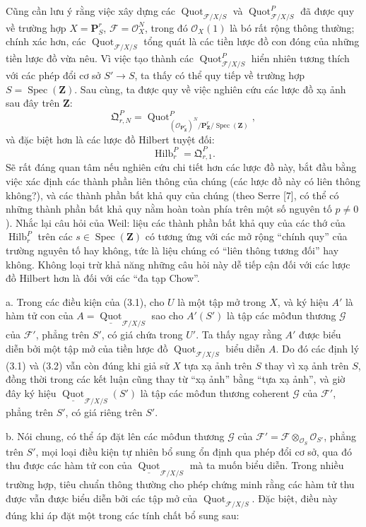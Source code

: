  Cũng cần lưu ý rằng việc xây dựng các
$\operatorname{Quot}_{\mathcal F/X/S}$ và
$\operatorname{Quot}^P_{\mathcal F/X/S}$ đã được quy về trường hợp
$X=\mathbf P^r_S$, $\mathcal F=\mathcal O_X^N$, trong đó
$\mathcal O_X(1)$ là bó rất rộng thông thường; chính xác hơn, các
$\operatorname{Quot}_{\mathcal F/X/S}$ tổng quát là các tiền lược đồ con đóng
của những tiền lược đồ vừa nêu. Vì việc tạo thành các
$\operatorname{Quot}^P_{\mathcal F/X/S}$ hiển nhiên tương thích với các phép
đổi cơ sở $S'\longrightarrow S$, ta thấy có thể quy tiếp về trường hợp
$S=\operatorname{Spec}(\mathbf Z)$. Sau cùng, ta được quy về việc nghiên
cứu các lược đồ xạ ảnh sau đây trên $\mathbf Z$:
\[
\mathfrak Q^P_{r,N}=
\operatorname{Quot}^{P}_{(\mathcal O_{\mathbf P^r_{\mathbf Z}})^N/
\mathbf P^r_{\mathbf Z}/\operatorname{Spec}(\mathbf Z)},
\]
và đặc biệt hơn là các lược đồ Hilbert tuyệt đối:
\[
\operatorname{Hilb}^P_r=\mathfrak Q^P_{r,1}.
\]
Sẽ rất đáng quan tâm nếu nghiên cứu chi tiết hơn các lược đồ này, bắt đầu bằng
việc xác định các thành phần liên thông của chúng (các lược đồ này có liên
thông không?), và các thành phần bất khả quy của
chúng (theo Serre [7], có thể có những thành phần bất khả quy nằm hoàn toàn
phía trên một số nguyên tố $p\neq0$). Nhắc lại câu hỏi của Weil: liệu các thành
phần bất khả quy của các thớ của $\operatorname{Hilb}^P_r$ trên các
$s\in\operatorname{Spec}(\mathbf Z)$ có tương ứng với các mở rộng
``chính quy'' của trường nguyên tố hay không, tức là liệu chúng có ``liên thông
tương đối'' hay không. Không loại trừ khả năng những câu hỏi này dễ tiếp cận
đối với các lược đồ Hilbert hơn là đối với các ``đa tạp Chow''.


\noindent a. Trong các điều kiện của (3.1), cho $U$ là một tập mở trong $X$,
và ký hiệu $A'$ là hàm tử con của
$A=\underline{\operatorname{Quot}}_{\mathcal F/X/S}$ sao cho $A'(S')$ là tập
các môđun thương $\mathcal G$ của $\mathcal F'$, phẳng trên $S'$, có giá chứa
trong $U'$. Ta thấy ngay rằng $A'$ được biểu diễn bởi một tập mở của tiền lược
đồ $\operatorname{Quot}_{\mathcal F/X/S}$ biểu diễn $A$. Do đó các định lý
(3.1) và (3.2)
vẫn còn đúng khi giả sử $X$ tựa xạ ảnh trên $S$ thay vì xạ ảnh trên $S$, đồng
thời trong các kết luận cũng thay từ ``xạ ảnh'' bằng ``tựa xạ ảnh'', và giờ
đây ký hiệu
$\underline{\operatorname{Quot}}_{\mathcal F/X/S}(S')$ là tập các môđun
thương coherent $\mathcal G$ của $\mathcal F'$, phẳng trên $S'$, có giá riêng
trên $S'$.

\medskip
\noindent b. Nói chung, có thể áp đặt lên các môđun thương $\mathcal G$ của
$\mathcal F'=\mathcal F\otimes_{\mathcal O_S}\mathcal O_{S'}$, phẳng trên
$S'$, mọi loại điều kiện tự nhiên bổ sung ổn định qua phép đổi cơ sở, qua đó thu
được các hàm tử con của
$\underline{\operatorname{Quot}}_{\mathcal F/X/S}$ mà ta muốn biểu diễn. Trong
nhiều trường hợp, tiêu chuẩn thông thường cho phép chứng minh rằng các hàm tử
thu được vẫn được biểu diễn bởi các tập mở của
$\operatorname{Quot}_{\mathcal F/X/S}$. Đặc biệt, điều này đúng khi áp đặt một
trong các tính chất bổ sung sau:

